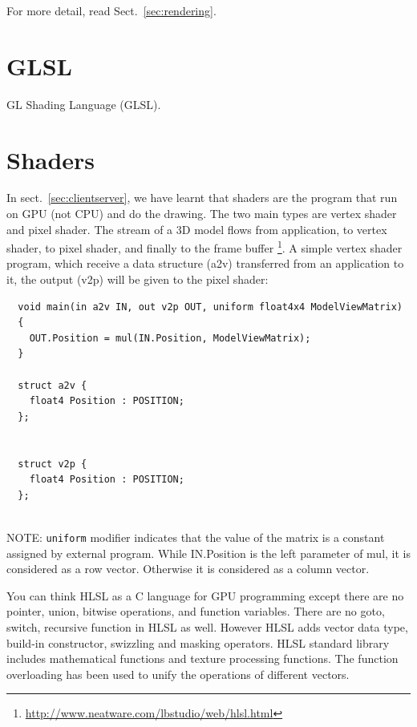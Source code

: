 For more detail, read Sect.~\ref{sec:rendering}. 

% 



\section{GLSL}
\label{sec:GLSL}

GL Shading Language (GLSL).

\section{Shaders}
\label{sec:shaders}

In sect.~\ref{sec:clientserver}, we have learnt that shaders are the
program that run on GPU (not CPU) and do the drawing. The two main types are
vertex shader and pixel shader. The stream of a 3D model flows from application,
to vertex shader, to pixel shader, and finally to the frame buffer
\footnote{\url{http://www.neatware.com/lbstudio/web/hlsl.html}}.
A simple vertex shader program, which receive a data structure (a2v)
transferred from an application to it, the output (v2p) will be given to the
pixel shader:
\begin{verbatim}
  void main(in a2v IN, out v2p OUT, uniform float4x4 ModelViewMatrix) 
  {
    OUT.Position = mul(IN.Position, ModelViewMatrix); 
  }
   
  struct a2v { 
    float4 Position : POSITION; 
  };


  struct v2p {
    float4 Position : POSITION;
  };
    
\end{verbatim}
NOTE: \verb!uniform! modifier indicates that the value of the matrix is a
constant assigned by external program. While IN.Position is the left parameter
of mul, it is considered as a row vector. Otherwise it is considered as a column
vector.  

\begin{framed}
You can think HLSL as a C language for GPU programming except there are no
pointer, union, bitwise operations, and function variables. There are no goto,
switch, recursive function in HLSL as well. However HLSL adds vector data type,
build-in constructor, swizzling and masking operators. HLSL standard library
includes mathematical functions and texture processing functions. The function
overloading has been used to unify the operations of different vectors.  
\end{framed}

